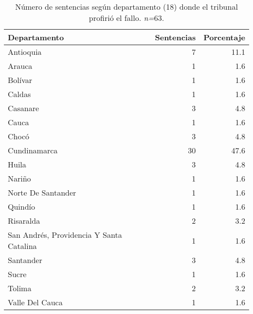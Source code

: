 \begin{table}[!htbp]
\centering
\caption{Número de sentencias según departamento (18) donde el tribunal profirió el fallo. \textit{n=}63.} 
\label{tab:depfal}
\begin{tabular}{lrr}
  \hline
Departamento & Sentencias & Porcentaje \\ 
  \hline
Antioquia &  7 & 11.1 \\ 
  Arauca &  1 & 1.6 \\ 
  Bolívar &  1 & 1.6 \\ 
  Caldas &  1 & 1.6 \\ 
  Casanare &  3 & 4.8 \\ 
  Cauca &  1 & 1.6 \\ 
  Chocó &  3 & 4.8 \\ 
  Cundinamarca & 30 & 47.6 \\ 
  Huila &  3 & 4.8 \\ 
  Nariño &  1 & 1.6 \\ 
  Norte De Santander &  1 & 1.6 \\ 
  Quindío &  1 & 1.6 \\ 
  Risaralda &  2 & 3.2 \\ 
  San Andrés, Providencia Y Santa Catalina &  1 & 1.6 \\ 
  Santander &  3 & 4.8 \\ 
  Sucre &  1 & 1.6 \\ 
  Tolima &  2 & 3.2 \\ 
  Valle Del Cauca &  1 & 1.6 \\ 
   \hline
\end{tabular}
\end{table}
